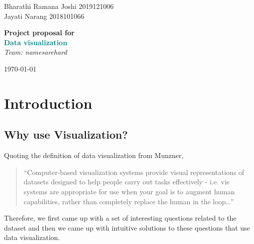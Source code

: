 \documentclass[titlepage, 12pt]{article}
\begin{document}
\begin{titlepage}

	\raggedleft

	\vspace*{\baselineskip}

	{Bharathi Ramana Joshi 2019121006\\Jayati Narang 2018101066}

	\vspace*{0.167\textheight}

	\textbf{\Large Project proposal for}\\[\baselineskip]

	\textbf{\textcolor{teal}{\huge Data visualization}}\\[\baselineskip]

    {\large \textit{Team: namesarehard}}
    \vfill

    \today

	\raggedright

\end{titlepage}

\newpage

\tableofcontents

\newpage

\section{Introduction}

\subsection{Why use Visualization?}
Quoting the definition of data visualization from Munzner,
\begin{quotation}
    ``Computer-based visualization systems provide visual representations of
    datasets designed to help people carry out tasks effectively - i.e. vis
    systems are appropriate for use when your goal is to augment human
    capabilities, rather than completely replace the human in the loop\dots''
\end{quotation}
Therefore, we first came up with a set of interesting questions related to the
dataset and then we came up with intuitive solutions to these questions that use
data visualization.
\end{document}
